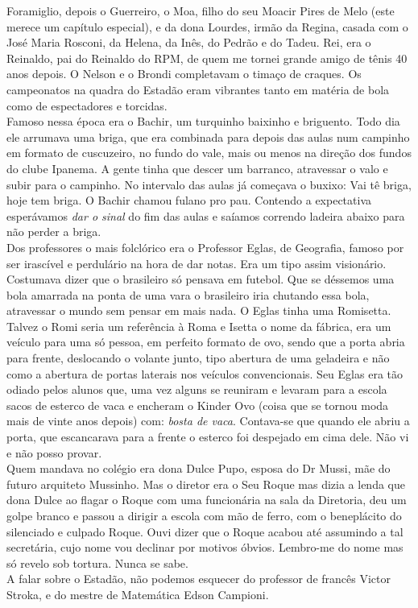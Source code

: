 \documentclass[12pt,brazil,]{book}
\begin{document}
Foramiglio, depois o Guerreiro, o Moa, filho do seu Moacir Pires de Melo
(este merece um capítulo especial), e da dona Lourdes, irmão da Regina,
casada com o José Maria Rosconi, da Helena, da Inês, do Pedrão e do
Tadeu. Rei, era o Reinaldo, pai do Reinaldo do RPM, de quem me tornei
grande amigo de tênis 40 anos depois. O Nelson e o Brondi completavam o
timaço de craques. Os campeonatos na quadra do Estadão eram vibrantes
tanto em matéria de bola como de espectadores e torcidas.\\
Famoso nessa época era o Bachir, um turquinho baixinho e briguento. Todo
dia ele arrumava uma briga, que era combinada para depois das aulas num
campinho em formato de cuscuzeiro, no fundo do vale, mais ou menos na
direção dos fundos do clube Ipanema. A gente tinha que descer um
barranco, atravessar o valo e subir para o campinho. No intervalo das
aulas já começava o buxixo: Vai tê briga, hoje tem briga. O Bachir
chamou fulano pro pau. Contendo a expectativa esperávamos \emph{dar o
sinal} do fim das aulas e saíamos correndo ladeira abaixo para não
perder a briga.\\
Dos professores o mais folclórico era o Professor Eglas, de Geografia,
famoso por ser irascível e perdulário na hora de dar notas. Era um tipo
assim visionário. Costumava dizer que o brasileiro só pensava em
futebol. Que se déssemos uma bola amarrada na ponta de uma vara o
brasileiro iria chutando essa bola, atravessar o mundo sem pensar em
mais nada. O Eglas tinha uma Romisetta. Talvez o Romi seria um
referência à Roma e Isetta o nome da fábrica, era um veículo para uma só
pessoa, em perfeito formato de ovo, sendo que a porta abria para frente,
deslocando o volante junto, tipo abertura de uma geladeira e não como a
abertura de portas laterais nos veículos convencionais. Seu Eglas era
tão odiado pelos alunos que, uma vez alguns se reuniram e levaram para a
escola sacos de esterco de vaca e encheram o Kinder Ovo (coisa que se
tornou moda mais de vinte anos depois) com: \emph{bosta de vaca}.
Contava-se que quando ele abriu a porta, que escancarava para a frente o
esterco foi despejado em cima dele. Não vi e não posso provar.\\
Quem mandava no colégio era dona Dulce Pupo, esposa do Dr Mussi, mãe do
futuro arquiteto Mussinho. Mas o diretor era o Seu Roque mas dizia a
lenda que dona Dulce ao flagar o Roque com uma funcionária na sala da
Diretoria, deu um golpe branco e passou a dirigir a escola com mão de
ferro, com o beneplácito do silenciado e culpado Roque. Ouvi dizer que o
Roque acabou até assumindo a tal secretária, cujo nome vou declinar por
motivos óbvios. Lembro-me do nome mas só revelo sob tortura. Nunca se
sabe.\\
A falar sobre o Estadão, não podemos esquecer do professor de francês
Victor Stroka, e do mestre de Matemática Edson Campioni.
\end{document}

